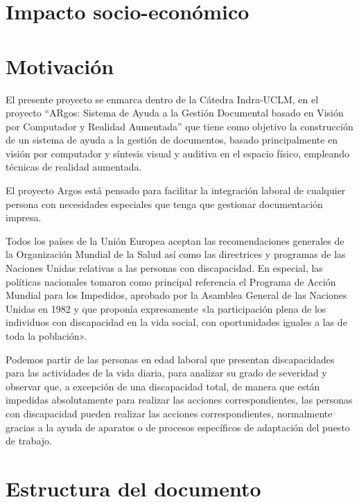 \section{Impacto socio-económico}

\section{Motivación}
  El presente proyecto se enmarca dentro de la Cátedra Indra-UCLM, en el proyecto “ARgos: Sistema de Ayuda a la Gestión Documental basado en Visión por Computador y Realidad Aumentada” que tiene como objetivo la construcción de un sistema de ayuda a la gestión de documentos, basado principalmente en visión por computador y síntesis visual y auditiva en el espacio físico, empleando técnicas de realidad aumentada.  
  
  El proyecto Argos está pensado para facilitar la integración laboral de cualquier persona con necesidades especiales que tenga que gestionar documentación impresa. 
  
  Todos los países de la Unión Europea aceptan las recomendaciones generales de la Organización Mundial de la Salud así como las directrices y programas de las Naciones Unidas relativas a las personas con discapacidad.  En especial, las políticas nacionales tomaron como principal referencia el Programa de Acción Mundial para los Impedidos, aprobado por la Asamblea General de las Naciones Unidas en 1982 y que proponía expresamente «la participación plena de los individuos con discapacidad en la vida social, con oportunidades iguales a las de toda la población». 

  Podemos partir de las personas en edad laboral que presentan discapacidades para las actividades de la vida diaria, para analizar su grado de severidad y observar que, a excepción de una discapacidad total, de manera que están impedidas absolutamente para realizar las acciones correspondientes, las personas con discapacidad pueden realizar las acciones correspondientes, normalmente gracias a la ayuda de aparatos o de procesos específicos de adaptación del puesto de trabajo.
  

 
  \section{Estructura del documento}

